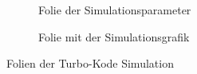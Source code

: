 \begin{figure}[th]
\centering
	\begin{subfigure}{0.45\textwidth}
	\centering
	\caption{Folie der Simulationsparameter}
	\label{pic:TurboSimulationParameter}
	\end{subfigure}
	\qquad
	\begin{subfigure}{0.45\textwidth}
	\centering
	\caption{Folie mit der Simulationsgrafik}
	\label{pic:TurboSimulationPlot}
	\end{subfigure}
\caption{Folien der Turbo-Kode Simulation}
\end{figure}

